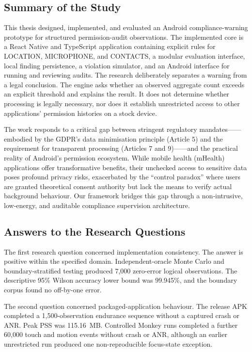 \subsection{Summary of the Study}

This thesis designed, implemented, and evaluated an Android compliance-warning prototype for structured permission-audit observations. The implemented core is a React Native and TypeScript application containing explicit rules for LOCATION, MICROPHONE, and CONTACTS, a modular evaluation interface, local finding persistence, a violation simulator, and an Android interface for running and reviewing audits. The research deliberately separates a warning from a legal conclusion. The engine asks whether an observed aggregate count exceeds an explicit threshold and explains the result. It does not determine whether processing is legally necessary, nor does it establish unrestricted access to other applications' permission histories on a stock device.

The work responds to a critical gap between stringent regulatory mandates——embodied by the GDPR's data minimisation principle (Article 5) and the requirement for transparent processing (Articles 7 and 9)——and the practical reality of Android's permission ecosystem. While mobile health (mHealth) applications offer transformative benefits, their unchecked access to sensitive data poses profound privacy risks, exacerbated by the ``control paradox'' where users are granted theoretical consent authority but lack the means to verify actual background behaviour. Our framework bridges this gap through a non‑intrusive, low‑energy, and auditable compliance supervision architecture.

\subsection{Answers to the Research Questions}

The first research question concerned implementation consistency. The answer is positive within the specified domain. Independent-oracle Monte Carlo and boundary-stratified testing produced 7,000 zero-error logical observations. The descriptive 95\% Wilson accuracy lower bound was 99.945\%, and the boundary corpus found no off-by-one error.

The second question concerned packaged-application behaviour. The release APK completed a 1,500-observation endurance sequence without a captured crash or ANR. Peak PSS was 115.16~MB. Controlled Monkey runs completed a further 60,000 touch and motion events without crash or ANR, although an earlier unrestricted run produced one non-reproducible focus-state exception.

